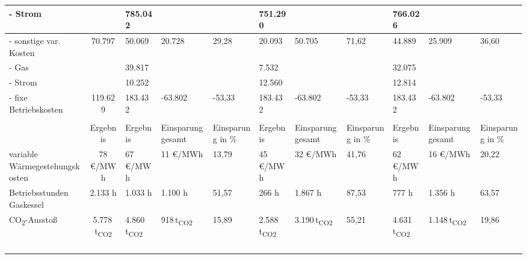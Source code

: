 \begin{table}[H]
{\begin{tabularx}{\textheight}{|l|c|Z|Z|Z|Z|Z|Z|Z|Z|Z|}
			\quad \quad - Strom &  &  785.042  &  &  &  751.290  &  &  &  766.026  &  &  \\
			\hline
			\quad - sonstige var. Kosten &  70.797  &  50.069  & 20.728  & 29,28 &  20.093  & 50.705  & 71,62 &  44.889  & 25.909  & 36,60 \\
			\quad \quad - Gas &  &  39.817  &  &  &  7.532  &  &  &  32.075  &  &  \\
			\quad \quad - Strom &  &  10.252  &  &  &  12.560  &  &  &  12.814  &  &  \\
			\hline
			- fixe Betriebskosten  &  119.629  &  183.432  &  -63.802  & -53,33 &  183.432  &  -63.802  & -53,33 &  183.432  &  -63.802  & -53,33 \\
			\hline
			\\
			\hline
			&Ergebnis&Ergebnis&Einsparung gesamt&Einsparung in \%&Ergebnis&Einsparung gesamt&Einsparung in \%&Ergebnis&Einsparung gesamt&Einsparung in \%\\
			\hline
			variable Wärmegestehungskosten \footnotemark &  78 \euro/MWh  &  67 \euro/MWh  &  11 \euro/MWh  & 13,79
			&  45 \euro/MWh  &  32 \euro/MWh  & 41,76
			&  62 \euro/MWh  &  16 \euro/MWh & 20,22
			\\
			\hline
			Betriebsstunden Gaskessel &  2.133 h  &  1.033 h  &  1.100 h  & 51,57
			&  266 h  &  1.867 h  & 87,53
			&  777 h  &  1.356 h  & 63,57
			\\
			\hline
			CO\textsubscript{2}-Ausstoß &  5.778\,t\textsubscript{CO2}  &  4.860\,t\textsubscript{CO2}  & 918\,t\textsubscript{CO2}  & 15,89 &  2.588\,t\textsubscript{CO2}  & 3.190\,t\textsubscript{CO2}  & 55,21 &  4.631\,t\textsubscript{CO2}&  1.148\,t\textsubscript{CO2}& 19,86\\
			\hline
			\\
			\\
			\\
			\\
			
		\end{tabularx}
	}
\end{table}



